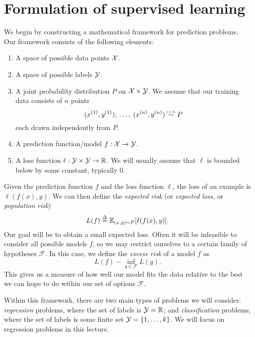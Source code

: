 \documentclass[11pt]{article}
\newcommand\iid{\stackrel{\mathclap{\tiny\normalfont\mbox{i.i.d.}}}{\sim}}
\newcommand\defn{\stackrel{\mathclap{\tiny\Delta}}{=}}
\newcommand\E{\mathbb{E}}
\begin{document}
\section{Formulation of supervised learning}
We begin by constructing a mathematical framework for prediction problems. Our framework consists of the following elements:
\begin{enumerate}
	\item A space of possible data points $\mathcal{X}$.
	\item A space of possible labels $\mathcal{Y}$.
	\item A joint probability distribution $P$ on $\mathcal{X}\times \mathcal{Y}$. We assume that our training data consists of $n$ points $$(x^{(1)}, y^{(1)}), \: \ldots, \: (x^{(n)}, y^{(n)}) \: \iid \: P$$ each drawn independently from $P$.
	\item A prediction function/model $f: \mathcal{X}\rightarrow \mathcal{Y}$.
	\item A loss function $\ell: \mathcal{Y}\times \mathcal{Y}\rightarrow \mathbb{R}$. We will usually assume that $\ell$ is bounded below by some constant, typically $0$.
\end{enumerate}
Given the prediction function $f$ and the loss function $\ell$, the loss of an example is $\ell(f(x),y)$. We can then define the \textit{expected risk} (or \textit{expected loss}, or \textit{population risk})
$$L(f) \defn \E_{(x,y)\sim P} [\ell(f(x),y)].$$ Our goal will be to obtain a small expected loss. Often it will be infeasible to consider all possible models $f$, so we may restrict ourselves to a certain family of hypotheses $\mathcal{F}$. In this case, we define the \textit{excess risk} of a model $f$ as $$L(f) - \inf_{g\in\mathcal{F}} L(g).$$ This gives us a measure of how well our model fits the data relative to the best we can hope to do within our set of options $\mathcal{F}$.

Within this framework, there are two main types of problems we will consider: \textit{regression} problems, where the set of labels is $\mathcal{Y}=\mathbb{R}$; and \textit{classification} problems, where the set of labels is some finite set $\mathcal{Y}=\{1,\ldots,k\}$. We will focus on regression problems in this lecture.
\end{document}
